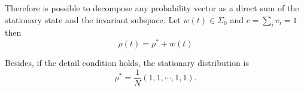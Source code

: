 Therefore is possible to decompose any probability vector as a direct sum of the stationary state and the invariant subspace. Let $w(t) \in \Sigma_0$ and $c = \sum_i v_i = 1$ then 
\begin{equation}
    \rho(t) = \rho^* + w(t)
\end{equation}

Besides, if the detail condition holds, the stationary distribution  is
\begin{equation}
    \rho^* = \frac{1}{N} \left(1,1,\cdots,1,1\right).
\end{equation} 


